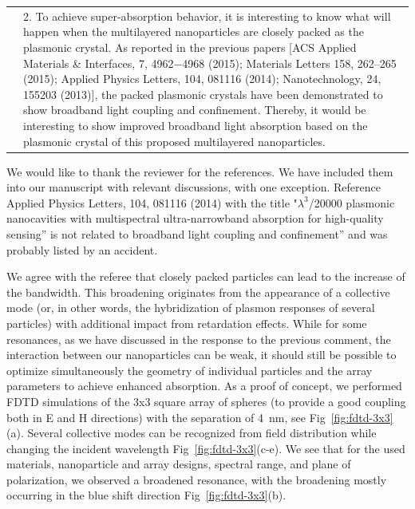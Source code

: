 \documentclass[a4paper]{article}
\begin{document}
\begin{tabular}[!H]{l|p{}}
  \quad & 2. To achieve super-absorption behavior, it is interesting
  to know what will happen when the multilayered nanoparticles are
  closely packed as the plasmonic crystal. As reported in the previous
  papers [ACS Applied Materials \& Interfaces, 7, 4962−4968 (2015);
  Materials Letters 158, 262–265 (2015); Applied Physics Letters, 104,
  081116 (2014); Nanotechnology, 24, 155203 (2013)], the packed
  plasmonic crystals have been demonstrated to show broadband light
  coupling and confinement. Thereby, it would be interesting to show
  improved broadband light absorption based on the plasmonic crystal
  of this proposed multilayered nanoparticles. 
\end{tabular}

We would like to thank the reviewer for the references. We have
included them into our manuscript with relevant discussions,
with one exception. Reference Applied Physics Letters, 104, 081116
(2014) with the title "$\lambda^3$/20000 plasmonic nanocavities with
multispectral ultra-narrowband absorption for high-quality sensing''
is not related to broadband light coupling and confinement'' and was
probably listed by an accident.

We agree with the referee that closely packed particles can lead to
the increase of the bandwidth. This broadening originates from the
appearance of a collective mode (or, in other words, the hybridization
of plasmon responses of several particles) with additional impact from
retardation effects. While for some resonances, as we have discussed
in the response to the previous comment, the interaction between our
nanoparticles can be weak, it should still be possible to optimize
simultaneously the geometry of individual particles and the array
parameters to achieve enhanced absorption. As a proof of concept, we
performed FDTD simulations of the 3x3 square array of spheres (to
provide a good coupling both in E and H directions) with the
separation of 4~nm, see Fig~\ref{fig:fdtd-3x3}(a). Several collective
modes can be recognized from field distribution while changing the
incident wavelength Fig~\ref{fig:fdtd-3x3}(c-e). We see that for the
used materials, nanoparticle and array designs, spectral range, and
plane of polarization, we observed a broadened resonance, with the
broadening mostly occurring in the blue shift direction
Fig~\ref{fig:fdtd-3x3}(b).
\end{document}
